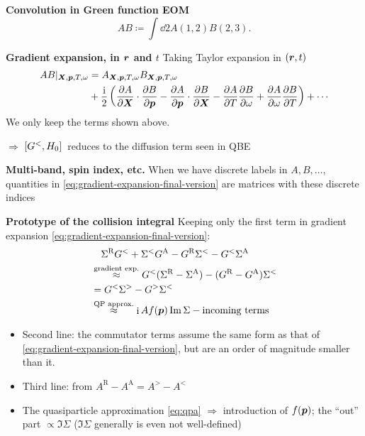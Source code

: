 \documentclass[t]{beamer}
\DeclareMathOperator{\ii}{i}
\begin{document}
\begin{frame}[allowframebreaks]
\framebreak

\textbf{Convolution in Green function EOM} 
\begin{equation}
    AB \coloneqq \int \dd{2} A(1, 2) B(2, 3).
\end{equation}

\textbf{Gradient expansion, in $\vb*{r}$ and $t$} 
Taking Taylor expansion in $(\vb*{r}, t)$
\begin{equation}
    \begin{aligned}
        AB|_{\vb*{X}, \vb*{p}, T, \omega} &= A_{\vb*{X}, \vb*{p}, T, \omega} B_{\vb*{X}, \vb*{p}, T, \omega} \\
        &+ \frac{\ii}{2} \left(
            \pdv{A}{\vb*{X}} \cdot \pdv{B}{\vb*{p}}
            - \pdv{A}{\vb*{p}} \cdot \pdv{B}{\vb*{X}}
            - \pdv{A}{T} \pdv{B}{\omega}
            + \pdv{A}{\omega} \pdv{B}{T}
        \right) + \cdots
    \end{aligned}
    \label{eq:gradient-expansion-final-version}
\end{equation}
We only keep the terms shown above. 

$\Rightarrow$ $\comm*{G^<}{H_0}$ reduces to the diffusion term seen in QBE

\vspace{0.25cm}

\textbf{Multi-band, spin index, etc.} When we have discrete labels in $A, B, \dots$,
quantities in \eqref{eq:gradient-expansion-final-version} 
are matrices with these discrete indices

\framebreak

\textbf{Prototype of the collision integral}
Keeping only the first term in gradient expansion \eqref{eq:gradient-expansion-final-version}:
\begin{equation}
    \begin{aligned}
        &\quad \Sigma^{\text{R}} G^< + \Sigma^< G^{\text{A}} - G^{\text{R}} \Sigma^< - G^< \Sigma^{\text{A}}\\
        &\stackrel{\text{gradient exp.}}{\approx} G^<(\Sigma^{\text{R}} - \Sigma^{\text{A}}) 
        - (G^{\text{R}} - G^{\text{A}}) \Sigma^< \\
        &= G^< \Sigma^> - G^> \Sigma^< \\
        &\stackrel{\text{QP approx.}}{\approx}  \ii A f (\vb*{p}) \Im \Sigma
        - \text{incoming terms} 
    \end{aligned}
\end{equation}    
\begin{itemize}
    \item Second line: the commutator terms assume  
    the same form as that of \eqref{eq:gradient-expansion-final-version},
    but are an order of magnitude smaller than it.
    \item Third line: from $A^{\text{R}} - A^{\text{A}} = A^> - A^<$
    \item The quasiparticle approximation \eqref{eq:qpa} $\Rightarrow$ introduction of $f(\vb*{p})$;
    the ``out'' part $\propto \Im \Sigma$
    ($\Im \Sigma$ generally is even not well-defined)
\end{itemize}


\end{frame}
\end{document}
